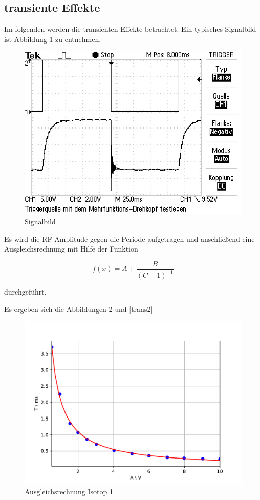 \subsection{transiente Effekte}
Im folgenden werden die transienten Effekte betrachtet. Ein typisches Signalbild ist Abbildung \ref{sigPic} zu entnehmen.

\begin{figure}[h]
\centering
\includegraphics[scale=0.8]{img/TEK0019.JPG}
\caption{Signalbild}
\label{sigPic}
\end{figure}

Es wird die RF-Amplitude gegen die Periode aufgetragen und anschließend eine Ausgleichsrechnung mit Hilfe der Funktion

\begin{equation}
f(x) = A + \frac{B}{(C-1)^{-1}}
\end{equation}

durchgeführt.

Es ergeben sich die Abbildungen \ref{trans1} und \ref{trans2}

\begin{figure}[h]
\centering
\includegraphics[scale=0.8]{img/trans1.pdf}
\caption{Ausgleichsrechnung Isotop 1}
\label{trans1}
\end{figure}

